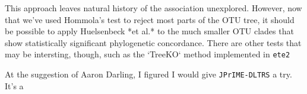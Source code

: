 This approach leaves natural history of the association unexplored. However,
now that we've used Hommola's test to reject most parts of the OTU tree, it
should be possible to apply Huelsenbeck *et al.* to the much smaller OTU 
clades that show statistically significant phylogenetic concordance. There
are other tests that may be intersting, though, such as the `TreeKO` method
implemented in {\tt ete2} %


At the suggestion of Aaron Darling, I figured I would give {\tt JPrIME-DLTRS}
a try. It's a 

